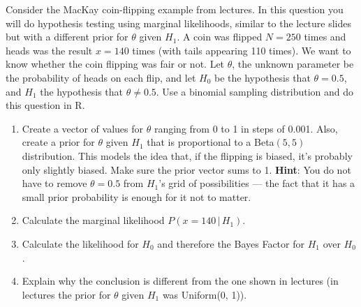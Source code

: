 \documentclass[12pt]{article}
\newcommand{\given}{\,|\,}
\begin{document}
\item
Consider the MacKay coin-flipping example from lectures. In this question
you will do hypothesis testing using marginal likelihoods, similar to the
lecture slides but with a different prior for $\theta$ given $H_1$.
A coin was flipped $N=250$ times
and heads was the result $x=140$ times (with tails appearing 110 times).
We want to know whether the coin flipping was fair or not.
Let $\theta$, the unknown parameter be the probability of heads on each flip,
and let $H_0$ be the hypothesis that $\theta=0.5$, and $H_1$ the hypothesis
that $\theta \neq 0.5$. Use a binomial sampling distribution and do this question
in R.
\begin{enumerate}
\item[(a)] Create a vector of values for $\theta$ ranging from 0 to 1 in steps
of 0.001. Also, create a prior for $\theta$ given $H_1$ 
that is proportional to a Beta$(5, 5)$ distribution. This models the idea that,
if the flipping is biased, it's probably only slightly biased.
Make sure the prior vector
sums to 1. {\bf Hint}: You do not have to remove
$\theta=0.5$ from $H_1$'s grid of possibilities --- the fact that it has
a small prior probability is enough for it not to matter.
\item[(b)] Calculate the marginal likelihood $P(x = 140 \given H_1)$.
\item[(c)] Calculate the likelihood for $H_0$ and therefore the Bayes Factor
for $H_1$ over $H_0$.
\item[(d)] Explain why the conclusion is different from the one shown in
lectures (in lectures the prior for $\theta$ given $H_1$ was Uniform(0, 1)).
\end{enumerate}
\end{document}

